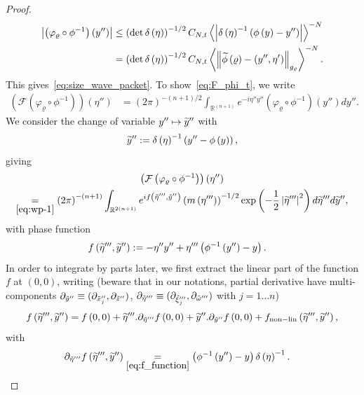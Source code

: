 \documentclass[10pt]{amsart}
\theoremstyle{definition}\newtheorem{defi}[theo]{Definition}\newtheorem{rema}[theo]{Remark}\newtheorem{exam}[theo]{Example}\newtheorem{exem}[theo]{Example}\newtheorem{nota}[theo]{Notation}
\newcommand{\clF}{\mathcal{F}}
\newcommand{\nonlin}{\mathrm{non-lin}}
\newcommand{\bbR}{\mathbb{R}}
\let\oldtilde\tilde
\renewcommand*{\tilde}[1]{\mathchoice{\widetilde{#1}}{\widetilde{#1}}{\oldtilde{#1}}{\oldtilde{#1}}}
\begin{document}
\begin{proof}
\begin{align*}
\left|\left(\varphi_{\varrho}\circ\phi^{-1}\right)\left(y''\right)\right| & \leq\left(\det \delta\left(\eta\right)\right)^{-1/2}C_{N,t}\left\langle \left|\delta\left(\eta\right)^{-1}\left(\phi\left(y\right)-y''\right)\right|\right\rangle ^{-N}\\
& =\left(\det \delta\left(\eta\right)\right)^{-1/2}C_{N,t}\left\langle \left\Vert \tilde{\phi}\left(\varrho\right)-\left(y'',\eta'\right)\right\Vert _{g_{\varrho}}\right\rangle ^{-N}.
\end{align*}
This gives~\eqref{eq:size_wave_packet}. To show~\eqref{eq:F_phi_t}, we write
\begin{align*}
\left(\clF\left(\varphi_{\varrho}\circ\phi^{-1}\right)\right)\left(\eta''\right) & =\left(2\pi\right)^{-\left(n+1\right)/2}\int_{\bbR^{\left(n+1\right)}}e^{-i\eta''y''}\left(\varphi_{\varrho}\circ\phi^{-1}\right)\left(y''\right)dy''.
\end{align*}
We consider the change of variable $y''\mapsto\tilde{y}''$ with
\[
\tilde{y}'':=\delta\left(\eta\right)^{-1}\left(y''-\phi\left(y\right)\right),
\]
giving
\begin{multline*}
\left(\clF\left(\varphi_{\varrho}\circ\phi^{-1}\right)\right)\left(\eta''\right)\\
\underset{\eqref{eq:wp-1}}{=}\left(2\pi\right)^{-\left(n+1\right)}\int_{\bbR^{2\left(n+1\right)}}e^{if\left(\tilde{\eta}''',\tilde{y}''\right)}\left(m\left(\eta'''\right)\right)^{-1/2}\exp\left(-\frac{1}{2}\left|\tilde{\eta}'''\right|^{2}\right)d\tilde{\eta}'''d\tilde{y}'',
\end{multline*}
with phase function
\begin{align}
f\left(\tilde{\eta}''',\tilde{y}''\right) & :=-\eta''y''+\eta'''\left(\phi^{-1}\left(y''\right)-y\right).\label{eq:f_function}
\end{align}
In order to integrate by parts later, we first extract the linear part of the function $f$ at $(0,0)$, writing (beware that in our notations, partial derivative have multi-components $\partial_{\tilde{y}''}\equiv(\partial_{\tilde{x}_{j}''},\partial_{\tilde{z}''})$, $\partial_{\tilde{\eta}'''}\equiv(\partial_{\tilde{\xi}_{j}'''},\partial_{\tilde{\omega}'''})$ with $j=1\ldots n$)
\[
f\left(\tilde{\eta}''',\tilde{y}''\right)=f\left(0,0\right)+\tilde{\eta}'''.\partial_{\tilde{\eta}'''}f\left(0,0\right)+\tilde{y}''.\partial_{\tilde{y}''}f\left(0,0\right)+f_{\nonlin}\left(\tilde{\eta}''',\tilde{y}''\right),
\]
with
\begin{align*}
\partial_{\tilde{\eta}'''}f\left(\tilde{\eta}''',\tilde{y}''\right) &\underset{\eqref{eq:f_function}}{=}\left(\phi^{-1}\left(y''\right)-y\right)\delta\left(\eta\right)^{-1}.

\end{align*}
\end{proof}
\end{document}
